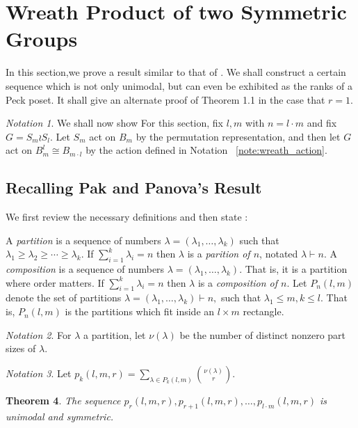 \documentclass{amsart}
\newtheorem{thm}{Theorem}[subsection]
\theoremstyle{remark}
\newtheorem{note}[thm]{Notation}
\newcommand\ssec{\subsection}
\begin{document}
\section{Wreath Product of two Symmetric Groups}

In this section,we prove a result similar to that of \cite[Theorem 1.1]{pak}. We shall construct a certain sequence which is not only unimodal, but can even be exhibited as the ranks of a Peck poset. It shall give an alternate proof of Theorem 1.1 in the case that $r = 1.$

\begin{note}
We shall now show 
For this section, fix $l,m$ with $n = l \cdot m$ and fix $G = S_m \wr S_l.$ Let $S_m$ act on $B_m$ by the permutation representation, and then let $G$ act on $B_{m}^l\cong B_{m \cdot l}$ by the action defined in Notation ~\ref{note:wreath_action}.
\end{note}

\ssec{Recalling Pak and Panova's Result}
We first review the necessary definitions and then state \cite[Theorem 1.1]{pak}:

A {\it partition} is a sequence of numbers $\lambda = (\lambda_1,\ldots, \lambda_k)$ such that $\lambda_1 \geq \lambda_2 \geq \cdots \geq \lambda_k.$ If $\sum_{i=1}^k \lambda_i = n$ then $\lambda$ is a {\it parition of $n$}, notated $\lambda \vdash n.$ A {\it composition} is a sequence of numbers $\lambda = (\lambda_1,\ldots, \lambda_k).$ That is, it is a partition where order matters. If $\sum_{i=1}^k \lambda_i = n$ then $\lambda$ is a {\it composition of $n$}. Let $P_n(l,m)$ denote the set of partitions $\lambda = (\lambda_1,\ldots, \lambda_k) \vdash n,$ such that $\lambda_1 \leq m,k \leq l.$ That is, $P_n(l,m)$ is the partitions which fit inside an $l \times m$ rectangle.

\begin{note}
\cite[Section 1]{pak} For $\lambda$ a partition, let $\nu(\lambda)$ be the number of distinct nonzero part sizes of $\lambda.$
\end{note}

\begin{note}
\cite[Section 1]{pak}
Let $p_k(l,m,r) = \sum_{\lambda \in P_k(l,m)} \binom{\nu(\lambda)}{r}.$
\end{note}

\begin{thm}
\label{thm:pak_thm}
\cite[Theorem 1.1]{pak}
The sequence $p_r(l,m,r), p_{r+1}(l,m,r),\ldots, p_{l\cdot m}(l,m,r)$ is unimodal and symmetric.
\end{thm}
\end{document}
